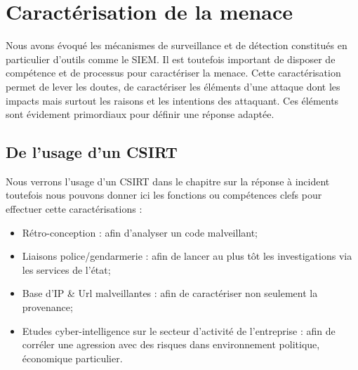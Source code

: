 
\section{Caractérisation de la menace}

Nous avons évoqué les mécanismes de surveillance et de détection constitués en particulier d'outils comme le SIEM.
Il est toutefois important de disposer de compétence et de processus pour caractériser la menace.
Cette caractérisation permet de lever les doutes, de caractériser les éléments d'une attaque dont les impacts mais surtout les raisons et les intentions des attaquant. Ces éléments sont évidement primordiaux pour définir une réponse adaptée.

\subsection{De l'usage d'un CSIRT}

Nous verrons l'usage d'un CSIRT dans le chapitre sur la réponse à incident toutefois nous pouvons donner ici les fonctions ou compétences clefs pour effectuer cette caractérisations :

\begin{itemize}
  \item Rétro-conception : afin d'analyser un code malveillant;
  \item Liaisons police/gendarmerie : afin de lancer au plus tôt les investigations via les services de l'état;
  \item Base  d'IP \& Url malveillantes : afin de caractériser non seulement la provenance;
  \item Etudes cyber-intelligence sur le secteur d'activité de l'entreprise : afin de corréler une agression avec des risques dans environnement politique, économique particulier.
\end{itemize}
